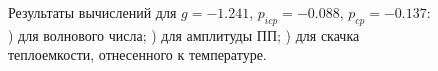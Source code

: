 
\begin{figure}[p]\label{fig:1}
\centering
{}
\newline
{}
\newline
\caption{Результаты вычислений для $g= -1.241$, $p_{icp}= -0.088$, $p_{cp}=-0.137$:
) для волнового числа; 
) для амплитуды ПП;
) для скачка теплоемкости, отнесенного к температуре.}
\end{figure}